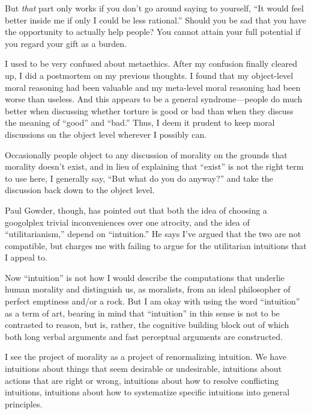{
 But \textit{that} part only works if you don't go
around saying to yourself, ``It would feel better
inside me if only I could be less rational.'' Should
you be sad that you have the opportunity to actually help people? You
cannot attain your full potential if you regard your gift as a burden.}

\myendsectiontext


{
 I used to be very confused about metaethics. After my confusion
finally cleared up, I did a postmortem on my previous thoughts. I found
that my object-level moral reasoning had been valuable and my
meta-level moral reasoning had been worse than useless. And this
appears to be a general syndrome---people do much better when
discussing whether torture is good or bad than when they discuss the
meaning of ``good'' and
``bad.'' Thus, I deem it prudent to
keep moral discussions on the object level wherever I possibly can.}

{
 Occasionally people object to any discussion of morality on the
grounds that morality doesn't exist, and in lieu of
explaining that ``exist'' is not the
right term to use here, I generally say, ``But what do
you do anyway?'' and take the discussion back down to
the object level.}

{
 Paul Gowder, though, has pointed out that both the idea of
choosing a googolplex trivial inconveniences over one atrocity, and the
idea of ``utilitarianism,'' depend
on ``intuition.'' He says
I've argued that the two are not compatible, but
charges me with failing to argue for the utilitarian intuitions that I
appeal to.}

{
 Now ``intuition'' is not how I
would describe the computations that underlie human morality and
distinguish us, as moralists, from an ideal philosopher of perfect
emptiness and/or a rock. But I am okay with using the word
``intuition'' as a term of art,
bearing in mind that ``intuition''
in this sense is not to be contrasted to reason, but is, rather, the
cognitive building block out of which both long verbal arguments and
fast perceptual arguments are constructed.}

{
 I see the project of morality as a project of renormalizing
intuition. We have intuitions about things that seem desirable or
undesirable, intuitions about actions that are right or wrong,
intuitions about how to resolve conflicting intuitions, intuitions
about how to systematize specific intuitions into general principles.}


